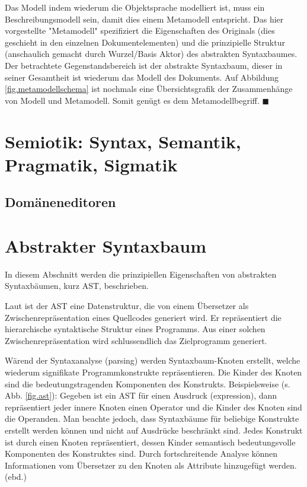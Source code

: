 Das Modell indem wiederum die Objektsprache modelliert ist, muss ein Beschreibungsmodell sein,
damit dies einem Metamodell entspricht.
Das hier vorgestellte "Metamodell" spezifiziert die Eigenschaften des Originals
(dies geschieht in den einzelnen Dokumentelementen)
und die prinzipielle Struktur (anschaulich gemacht durch Wurzel/Basis Aktor)
des abstrakten Syntaxbaumes.
Der betrachtete Gegenstandsbereich ist der abstrakte Syntaxbaum, dieser in seiner 
Gesamtheit ist wiederum das Modell des Dokuments.
Auf Abbildung \ref{fig.metamodellschema} ist nochmals eine Übersichtsgrafik der Zusammenhänge von
Modell und Metamodell.
Somit genügt es dem Metamodellbegriff. $\blacksquare$




\section{Semiotik: Syntax, Semantik, Pragmatik, Sigmatik}

\subsection{Domäneneditoren}


\section{Abstrakter Syntaxbaum}\label{sec.ast}

In diesem Abschnitt werden die prinzipiellen Eigenschaften von abstrakten Syntaxbäumen,
kurz AST, beschrieben.

Laut \citep{dragonbook} ist der AST eine Datenstruktur, die von einem Übersetzer als
Zwischenrepräsentation eines Quellcodes generiert wird.
Er repräsentiert die hierarchische syntaktische Struktur eines Programms.
Aus einer solchen Zwischenrepräsentation wird schlussendlich das Zielprogramm generiert.

Wärend der Syntaxanalyse (parsing) werden Syntaxbaum-Knoten erstellt, welche wiederum
signifikate Programmkonstrukte repräsentieren.
Die Kinder des Knoten sind die bedeutungstragenden Komponenten des Konstrukts.
Beispielsweise (s. Abb. \ref{fig.ast}): Gegeben ist ein AST für einen Ausdruck (expression),
dann repräsentiert jeder innere Knoten einen Operator und die Kinder des Knoten
sind die Operanden.
Man beachte jedoch, dass Syntaxbäume für beliebige Konstrukte erstellt werden können
und nicht auf Ausdrücke beschränkt sind.
Jedes Konstrukt ist durch einen Knoten repräsentiert, dessen Kinder semantisch
bedeutungsvolle Komponenten des Konstruktes sind.
Durch fortschreitende Analyse können Informationen vom Übersetzer
zu den Knoten als Attribute hinzugefügt werden. (ebd.)

